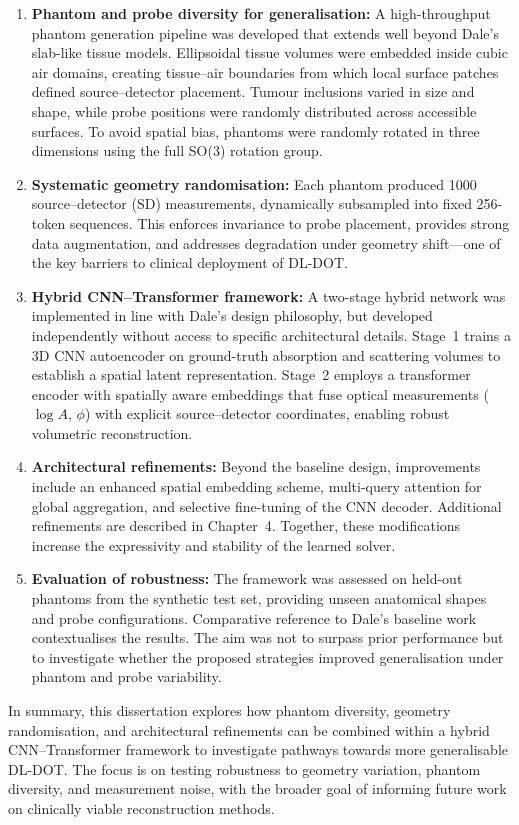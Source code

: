 \begin{enumerate}
    \item \textbf{Phantom and probe diversity for generalisation:} A high-throughput phantom generation pipeline was developed that extends well beyond Dale’s slab-like tissue models. Ellipsoidal tissue volumes were embedded inside cubic air domains, creating tissue–air boundaries from which local surface patches defined source–detector placement. Tumour inclusions varied in size and shape, while probe positions were randomly distributed across accessible surfaces. To avoid spatial bias, phantoms were randomly rotated in three dimensions using the full SO(3) rotation group.
    
    \item \textbf{Systematic geometry randomisation:} Each phantom produced 1000 source–detector (SD) measurements, dynamically subsampled into fixed 256-token sequences. This enforces invariance to probe placement, provides strong data augmentation, and addresses degradation under geometry shift—one of the key barriers to clinical deployment of DL-DOT.
    
    \item \textbf{Hybrid CNN–Transformer framework:} A two-stage hybrid network was implemented in line with Dale’s design philosophy, but developed independently without access to specific architectural details. Stage~1 trains a 3D CNN autoencoder on ground-truth absorption and scattering volumes to establish a spatial latent representation. Stage~2 employs a transformer encoder with spatially aware embeddings that fuse optical measurements ($\log A$, $\phi$) with explicit source–detector coordinates, enabling robust volumetric reconstruction.
    
    \item \textbf{Architectural refinements:} Beyond the baseline design, improvements include an enhanced spatial embedding scheme, multi-query attention for global aggregation, and selective fine-tuning of the CNN decoder. Additional refinements are described in Chapter~4. Together, these modifications increase the expressivity and stability of the learned solver.
    
    \item \textbf{Evaluation of robustness:} The framework was assessed on held-out phantoms from the synthetic test set, providing unseen anatomical shapes and probe configurations. Comparative reference to Dale’s baseline work contextualises the results. The aim was not to surpass prior performance but to investigate whether the proposed strategies improved generalisation under phantom and probe variability.
\end{enumerate}

In summary, this dissertation explores how phantom diversity, geometry randomisation, and architectural refinements can be combined within a hybrid CNN–Transformer framework to investigate pathways towards more generalisable DL-DOT. The focus is on testing robustness to geometry variation, phantom diversity, and measurement noise, with the broader goal of informing future work on clinically viable reconstruction methods.
